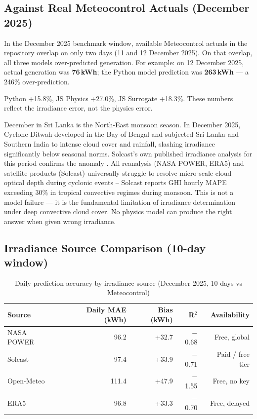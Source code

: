 \documentclass[11pt, a4paper]{article}
\begin{document}
\subsection{Against Real Meteocontrol Actuals (December 2025)}

In the December 2025 benchmark window, available Meteocontrol actuals in the
repository overlap on only two days (11 and 12 December 2025). On that overlap,
all three models over-predicted generation. For example: on 12 December 2025,
actual generation was \textbf{76\,kWh}; the Python model prediction was
\textbf{263\,kWh} --- a 246\% over-prediction.

Python +15.8\%, JS Physics +27.0\%, JS Surrogate +18.3\%.
These numbers reflect the irradiance error, not the physics error.

\begin{insightbox}
December in Sri Lanka is the North-East monsoon season. In December 2025,
Cyclone Ditwah developed in the Bay of Bengal and subjected Sri Lanka and
Southern India to intense cloud cover and rainfall, slashing irradiance
significantly below seasonal norms. Solcast's own published irradiance
analysis for this period confirms the anomaly \cite{solcast2025cyclone}.
All reanalysis (NASA POWER, ERA5) and satellite products (Solcast) universally
struggle to resolve micro-scale cloud optical depth during cyclonic events --
Solcast reports GHI hourly MAPE exceeding 30\% in tropical convective
regimes during monsoon.
This is not a model failure --- it is the fundamental limitation of irradiance
determination under deep convective cloud cover. No physics model can produce
the right answer when given wrong irradiance.
\end{insightbox}

\subsection{Irradiance Source Comparison (10-day window)}

\begin{table}[H]
\centering
\caption{Daily prediction accuracy by irradiance source (December 2025, 10 days vs Meteocontrol)}
\label{tab:sources}
\small
\begin{tabular}{l r r r r}
\toprule
Source & Daily MAE (kWh) & Bias (kWh) & R$^2$ & Availability \\
\midrule
NASA POWER  & 96.2 & +32.7 & $-$0.68 & Free, global \\
Solcast     & 97.4 & +33.9 & $-$0.71 & Paid / free tier \\
Open-Meteo  & 111.4 & +47.9 & $-$1.55 & Free, no key \\
ERA5        & 96.8 & +33.3 & $-$0.70 & Free, delayed \\
\bottomrule
\end{tabular}
\end{table}
\end{document}
